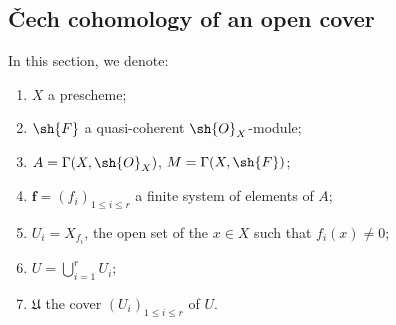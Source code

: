 \subsection{\v Cech cohomology of an open cover}
\label{subsection:III.1.2}

\begin{notation}[1.2.1]
\label{III.1.2.1}
In this section, we denote:
\begin{enumerate}
  \item $X$ a prescheme;
  \item $\sh{F}$ a quasi-coherent $\sh{O}_X$-module;
  \item $A=\Gamma(X,\sh{O}_X)$, $M=\Gamma(X,\sh{F})$;
  \item $\mathbf{f}=(f_i)_{1\leq i\leq r}$ a finite system of elements of $A$;
  \item $U_i=X_{f_i}$, the open set  of the $x\in X$ such that $f_i(x)\neq 0$;
  \item $U=\bigcup_{i=1}^r U_i$;
  \item $\mathfrak{U}$ the cover $(U_i)_{1\leq i\leq r}$ of $U$.
\end{enumerate}
\end{notation}

